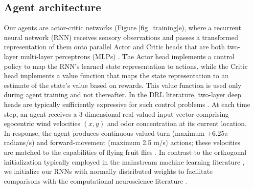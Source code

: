 \documentclass[5p,twocolumn,authoryear]{elsarticle}
\begin{document}

\subsection*{Agent architecture}
\label{sec_methods_arch}
Our agents are actor-critic networks (Figure \ref{fig_training}e), where a recurrent neural network (RNN) receives sensory observations and passes a transformed representation of them onto parallel Actor and Critic heads
that are both two-layer multi-layer perceptrons (MLPs) \citep{konda2000actor}.
The Actor head implements a control policy to map the RNN's learned state representation to actions, while the Critic head implements a value function that maps the state representation to an estimate of the state's value based on rewards.
This value function is used only during agent training and not thereafter.
In the DRL literature, two-layer deep heads are typically sufficiently expressive for such control problems \citep{hill2018stable}.
At each time step, an agent receives a 3-dimensional real-valued input vector comprising egocentric wind velocities $(x, y)$ and odor concentration at its current location.
In response, the agent produces continuous valued turn (maximum $\pm  6.25 \pi$ radians/s) and forward-movement (maximum 2.5 m/s) actions; these velocities are matched to the capabilities of flying fruit flies \citep{van2014plume,van2008insects}.
In contrast to the orthogonal initialization typically employed in the mainstream machine learning literature \citep{henaff2016recurrent}, we initialize our RNNs with normally distributed weights to facilitate comparisons with the computational neuroscience literature \citep{vogels2005neural,sussillo2014neural,yang2019task}. 
\end{document}
